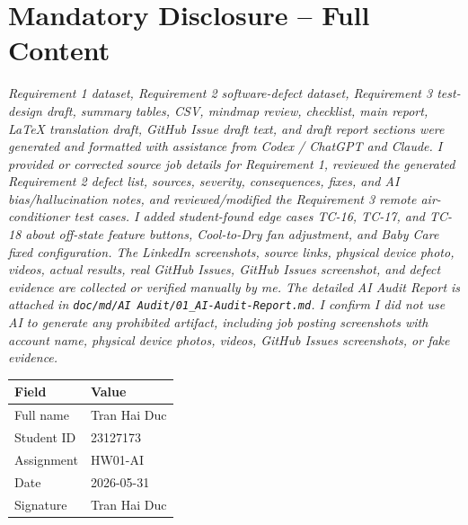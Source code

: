 \documentclass[12pt, a4paper]{article}
\begin{document}
\section{Mandatory Disclosure -- Full Content}

\begin{mdframed}[linecolor=RuleGray, backgroundcolor=gray!5, linewidth=1pt,
  innerleftmargin=12pt, innerrightmargin=12pt, innertopmargin=10pt, innerbottommargin=10pt]
\itshape
Requirement 1 dataset, Requirement 2 software-defect dataset, Requirement 3 test-design draft, summary tables, CSV, mindmap review, checklist, main report, \LaTeX{} translation draft, GitHub Issue draft text, and draft report sections were generated and formatted with assistance from Codex / ChatGPT and Claude. I provided or corrected source job details for Requirement 1, reviewed the generated Requirement 2 defect list, sources, severity, consequences, fixes, and AI bias/hallucination notes, and reviewed/modified the Requirement 3 remote air-conditioner test cases. I added student-found edge cases TC-16, TC-17, and TC-18 about off-state feature buttons, Cool-to-Dry fan adjustment, and Baby Care fixed configuration. The LinkedIn screenshots, source links, physical device photo, videos, actual results, real GitHub Issues, GitHub Issues screenshot, and defect evidence are collected or verified manually by me. The detailed AI Audit Report is attached in \texttt{doc/md/AI Audit/01\_AI-Audit-Report.md}. I confirm I did not use AI to generate any prohibited artifact, including job posting screenshots with account name, physical device photos, videos, GitHub Issues screenshots, or fake evidence.
\end{mdframed}

\begin{table}[h!]
\centering
\begin{tabularx}{\textwidth}{@{} L{4cm} X @{}}
\toprule
{}
\textbf{Field} & \textbf{Value} \\
\midrule
Full name & Tran Hai Duc \\
Student ID & 23127173 \\
Assignment & HW01-AI \\
Date & 2026-05-31 \\
Signature & Tran Hai Duc \\
\bottomrule
\end{tabularx}
\end{table}
\end{document}
